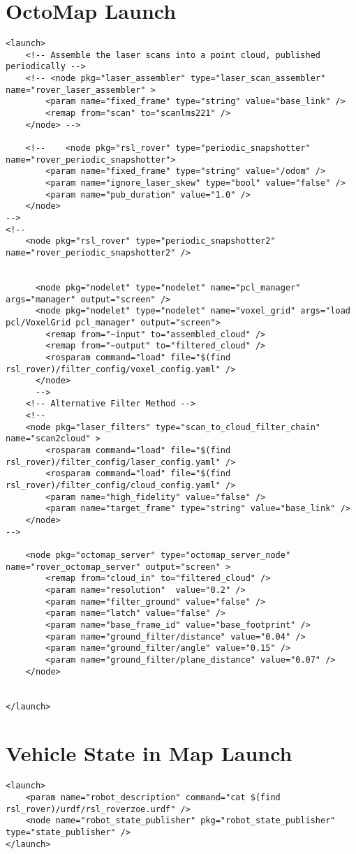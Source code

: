 \section{OctoMap Launch}
\begin{verbatim}
<launch> 
	<!-- Assemble the laser scans into a point cloud, published periodically -->
	<!-- <node pkg="laser_assembler" type="laser_scan_assembler" name="rover_laser_assembler" >
		<param name="fixed_frame" type="string" value="base_link" />
		<remap from="scan" to="scanlms221" />
	</node> -->

	<!--	<node pkg="rsl_rover" type="periodic_snapshotter" name="rover_periodic_snapshotter">
		<param name="fixed_frame" type="string" value="/odom" />
		<param name="ignore_laser_skew" type="bool" value="false" />	
		<param name="pub_duration" value="1.0" />
	</node>
-->
<!--
	<node pkg="rsl_rover" type="periodic_snapshotter2" name="rover_periodic_snapshotter2" />


	  <node pkg="nodelet" type="nodelet" name="pcl_manager" args="manager" output="screen" />
	  <node pkg="nodelet" type="nodelet" name="voxel_grid" args="load pcl/VoxelGrid pcl_manager" output="screen">
		<remap from="~input" to="assembled_cloud" />
		<remap from="~output" to="filtered_cloud" />
		<rosparam command="load" file="$(find rsl_rover)/filter_config/voxel_config.yaml" />
	  </node>
	  -->
	<!-- Alternative Filter Method -->
	<!--
	<node pkg="laser_filters" type="scan_to_cloud_filter_chain" name="scan2cloud" >
		<rosparam command="load" file="$(find rsl_rover)/filter_config/laser_config.yaml" />
		<rosparam command="load" file="$(find rsl_rover)/filter_config/cloud_config.yaml" />
		<param name="high_fidelity" value="false" />
		<param name="target_frame" type="string" value="base_link" />
	</node>
-->

	<node pkg="octomap_server" type="octomap_server_node" name="rover_octomap_server" output="screen" >
		<remap from="cloud_in" to="filtered_cloud" />
		<param name="resolution"  value="0.2" />
		<param name="filter_ground" value="false" />
		<param name="latch" value="false" />
		<param name="base_frame_id" value="base_footprint" />
		<param name="ground_filter/distance" value="0.04" />
		<param name="ground_filter/angle" value="0.15" />
		<param name="ground_filter/plane_distance" value="0.07" />
	</node>


</launch>
\end{verbatim}


\section{Vehicle State in Map Launch}
\begin{verbatim}
<launch>
	<param name="robot_description" command="cat $(find rsl_rover)/urdf/rsl_roverzoe.urdf" />
	<node name="robot_state_publisher" pkg="robot_state_publisher" type="state_publisher" />
</launch>
\end{verbatim}


